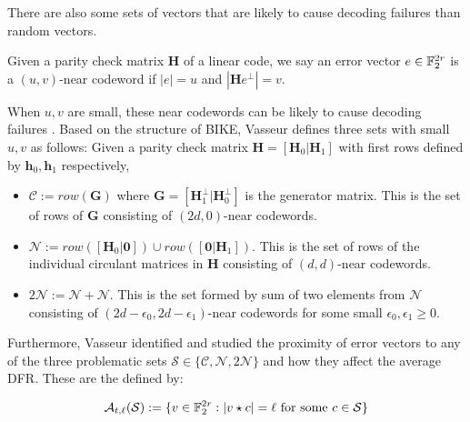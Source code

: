 There are also some sets of vectors that are likely to cause decoding failures than random vectors.

\begin{defn}
Given a parity check matrix $\mathbf{H}$ of a linear code, we say an error vector $e \in \mathbb{F}_2^{2r}$ is a $(u,v)$-near codeword if $|e| = u$ and $|\mathbf{H}e^\perp|=v$.
\end{defn}

When $u, v$ are small, these near codewords can be likely to cause decoding failures \cite{Richardson03}. Based on the structure of BIKE, Vasseur defines three sets with small $u,v$ as follows: Given a parity check matrix $\mathbf{H} = [\mathbf{H}_0 | \mathbf{H}_1 ]$ with first rows defined by $\mathbf{h}_0, \mathbf{h}_1$ respectively,

\begin{itemize}
\item $\mathcal{C} := row(\mathbf{G})$ where $\mathbf{G} = [ \mathbf{H}_1^\perp | \mathbf{H}_0^\perp ]$ is the generator matrix. This is the set of rows of $\mathbf{G}$ consisting of $(2d,0)$-near codewords.
\item $\mathcal{N} := row([\mathbf{H}_0 | \mathbf{0}]) \cup row([\mathbf{0} | \mathbf{H}_1])$. This is the set of rows of the individual circulant matrices in $\mathbf{H}$ consisting of $(d,d)$-near codewords.
\item $2\mathcal{N} := \mathcal{N} + \mathcal{N}$. This is the set formed by sum of two elements from $\mathcal{N}$ consisting of $(2d - \epsilon_0, 2d - \epsilon_1)$-near codewords for some small $\epsilon_0,\epsilon_1\geq 0$.
\end{itemize}

Furthermore, Vasseur identified and studied the proximity of error vectors to any of the three problematic sets $\mathcal{S} \in \{ \mathcal{C}, \mathcal{N}, 2\mathcal{N} \}$ and how they affect the average DFR. These are the defined by:

\[
\mathcal{A}_{t, \ell}(\mathcal{S}) := \{ v \in \mathbb{F}_2^{2r} : |v \star c | = \ell \text{ for some } c \in \mathcal{S} \}
\]

